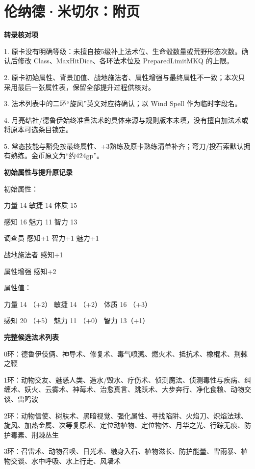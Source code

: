\documentclass[letterpaper,openany,twoside,twocolumn]{book}
\begin{document}
\clearpage
{}
\onecolumn\pagestyle{empty}
\normalfont\normalsize
\setlength{\parindent}{0pt}\setlength{\parskip}{5pt}

\section*{伦纳德·米切尔：附页}

\par\noindent\textbf{转录核对项}\par
1. 原卡没有明确等级：未擅自按5级补上法术位、生命骰数量或荒野形态次数。确认后修改 Class、MaxHitDice、各环法术位及 PreparedLimitMKQ 的上限。\par
2. 原卡初始属性、背景加值、战地施法者、属性增强与最终属性不一致；本次只采用最后一张属性表，保留全部提升过程供核对。\par
3. 法术列表中的二环“旋风”英文对应待确认；以 Wind Spell 作为临时字段名。\par
4. 月亮结社/德鲁伊始终准备法术的具体来源与规则版本未填，没有擅自加法术或将原本可选条目锁定。\par
5. 常态技能与豁免按最终属性、+3熟练及原卡熟练清单补齐；弯刀/投石索默认拥有熟练。金币原文为“约424gp”。\par


\par\noindent\textbf{初始属性与提升原记录}\par
初始属性：\par
力量    14         敏捷    14       体质      15\par
感知    16        魅力    11          智力      13\par
调查员 感知+1 智力+1 魅力+1\par
战地施法者 感知+1\par
属性增强 感知+2\par
属性值：\par
力量    14 （+2）    敏捷    14  （+2）    体质    16 （+3）\par
感知    20 （+5）    魅力    11  （+0）    智力    13（+1）\par


\par\noindent\textbf{完整候选法术列表}\par
0环：德鲁伊伎俩、神导术、修复术、毒气喷溅、燃火术、抵抗术、橡棍术、荆棘之鞭\par
1环：动物交友、魅惑人类、造水/毁水、疗伤术、侦测魔法、侦测毒性与疾病、纠缠术、妖火、云雾术、神莓术、治愈真言、跳跃术、大步奔行、净化食粮、动物交谈、雷鸣波\par
2环：动物信使、树肤术、黑暗视觉、强化属性、寻找陷阱、火焰刀、炽焰法球、旋风、加热金属、次等复原术、定位动植物、定位物体、月华之光、行踪无痕、防护毒素、荆棘丛生\par
3环：召雷术、动物召唤、日光术、融身入石、植物滋长、防护能量、雪雨暴、植物交谈、水中呼吸、水上行走、风墙术\par
\end{document}
